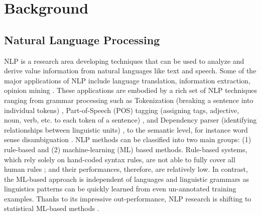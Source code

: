\documentclass[Journal, BackFigs,NoLists, DoubleSpace]{ascelike}%
\begin{document}
\section{Background} \label{sec:litrev} %
%
\subsection{Natural Language Processing}
NLP is a research area developing techniques that can be used to analyze and derive value information from natural languages like text and speech. Some of the major applications of NLP include language translation, information extraction, opinion mining \cite{Cambria14}. These applications are embodied by a rich set of NLP techniques ranging from grammar processing such as Tokenization (breaking a sentence into individual tokens) \cite{Webster92,Zhao11},  Part-of-Speech (POS) tagging (assigning tags, adjective, noun, verb, etc. to each token of a sentence) \cite{Toutanova03,Cunningham02}, and Dependency parser (identifying relationships between linguistic units) \cite{chen14}, to the semantic level, for instance word sense disambiguation \cite{Lesk86,Yarowsky95,Navigli09}. NLP methods can be classified into two main groups: (1) rule-based and (2) machine-learning (ML) based methods. Rule-based systems, which rely solely on hand-coded syntax rules, are not able to fully cover all human rules \cite{Marcus95}; and their performances, therefore, are relatively low. In contrast, the ML-based approach is independent of languages and linguistic grammars \cite{costa-jussa12} as linguistics patterns can be quickly learned from even un-annotated training examples. Thanks to its impressive out-performance, NLP research is shifting to statistical ML-based methods \cite{Cambria14}. 
%
\end{document}
